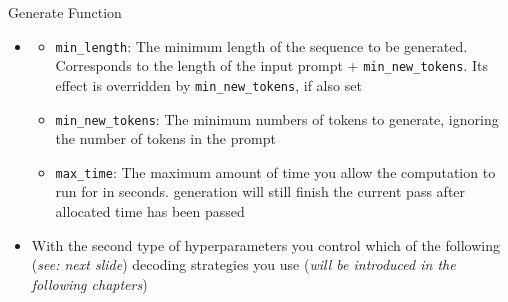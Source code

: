 \documentclass[11pt,compress,t,notes=noshow, xcolor=table]{beamer}
\begin{document}

\begin{frame}{Generate Function}

\begin{itemize}
    \item[]
    \begin{itemize}
        \item \texttt{min\_length}: The minimum length of the sequence to be generated. Corresponds to the length of the input prompt + \texttt{min\_new\_tokens}. Its effect is overridden by \texttt{min\_new\_tokens}, if also set
        \item \texttt{min\_new\_tokens}: The minimum numbers of tokens to generate, ignoring the number of tokens in the prompt
        \item \texttt{max\_time}: The maximum amount of time you allow the computation to run for in seconds. generation will still finish the current pass after allocated time has been passed
    \end{itemize}
    \item With the second type of hyperparameters you control which of the following (\textit{see: next slide}) decoding strategies you use (\textit{will be introduced in the following chapters})
\end{itemize}

\vfill
    
\end{frame}

\end{document}
